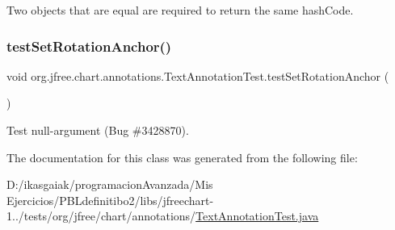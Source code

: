 Two objects that are equal are required to return the same hash\+Code. \mbox{\label{classorg_1_1jfree_1_1chart_1_1annotations_1_1_text_annotation_test_a729e41c7c49bed6929e6e80dc866df97}} 
\subsubsection{\texorpdfstring{test\+Set\+Rotation\+Anchor()}{testSetRotationAnchor()}}
{\footnotesize\ttfamily void org.\+jfree.\+chart.\+annotations.\+Text\+Annotation\+Test.\+test\+Set\+Rotation\+Anchor (\begin{DoxyParamCaption}{ }\end{DoxyParamCaption})}

Test null-\/argument (Bug \#3428870). 

The documentation for this class was generated from the following file\+:\begin{DoxyCompactItemize}
\item 
D\+:/ikasgaiak/programacion\+Avanzada/\+Mis Ejercicios/\+P\+B\+Ldefinitibo2/libs/jfreechart-\/1../tests/org/jfree/chart/annotations/\mbox{\hyperlink{_text_annotation_test_8java}{Text\+Annotation\+Test.\+java}}\end{DoxyCompactItemize}
